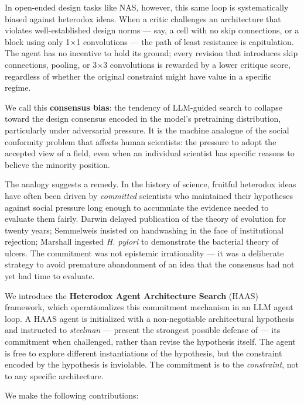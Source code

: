 \documentclass[10pt]{article}
\newcommand{\haas}{\textsc{HAAS}}
\begin{document}
In open-ended design tasks like NAS, however, this same loop is systematically
biased against heterodox ideas. When a critic challenges an architecture that
violates well-established design norms --- say, a cell with no skip connections,
or a block using only 1$\times$1 convolutions --- the path of least resistance
is capitulation. The agent has no incentive to hold
its ground; every revision that introduces skip connections, pooling, or 3$\times$3
convolutions is rewarded by a lower critique score, regardless of whether the
original constraint might have value in a specific regime.

We call this \textbf{consensus bias}: the tendency of LLM-guided search to
collapse toward the design consensus encoded in the model's pretraining
distribution, particularly under adversarial pressure. It is the machine
analogue of the social conformity problem that affects human scientists: the
pressure to adopt the accepted view of a field, even when an individual
scientist has specific reasons to believe the minority position.

The analogy suggests a remedy. In the history of science, fruitful heterodox
ideas have often been driven by \emph{committed} scientists who maintained their
hypotheses against social pressure long enough to accumulate the evidence needed
to evaluate them fairly. Darwin delayed publication of the theory of evolution
for twenty years; Semmelweis insisted on handwashing in the face of institutional
rejection; Marshall ingested \textit{H. pylori} to demonstrate the bacterial
theory of ulcers. The commitment was not epistemic irrationality --- it was a
deliberate strategy to avoid premature abandonment of an idea that the consensus
had not yet had time to evaluate.

We introduce the \textbf{Heterodox Agent Architecture Search} (\haas{})
framework, which operationalizes this commitment mechanism in an LLM agent loop.
A \haas{} agent is initialized with a non-negotiable architectural hypothesis
and instructed to \emph{steelman} --- present the strongest possible defense of
--- its commitment when challenged, rather than revise the hypothesis itself.
The agent is free to explore different instantiations of the hypothesis, but
the constraint encoded by the hypothesis is inviolable. The commitment is to
the \emph{constraint}, not to any specific architecture.

We make the following contributions:
\end{document}
